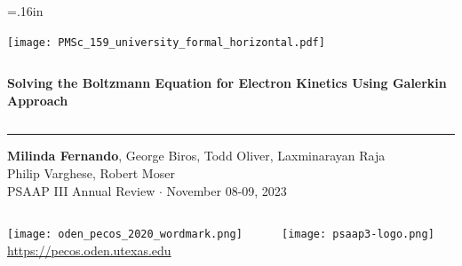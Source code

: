 \documentclass[mathserif, aspectratio=169]{beamer}
\begin{document}


\hoffset=.16in

\begin{frame}[plain,t]{}
\makeatletter
\texttt{[image: PMSc\_159\_university\_formal\_horizontal.pdf]} \newline
\begin{columns}[T,onlytextwidth]
{\bf \color{burntorange} \selectfont 
Solving the Boltzmann Equation for Electron Kinetics Using Galerkin Approach %
}
\end{columns}
\vspace*{.15cm}
\rule{.8\textwidth}{0.6pt} \newline

\vspace*{0.05cm}
{\selectfont
  { \scriptsize
    \textbf{Milinda Fernando}, George Biros, Todd Oliver, Laxminarayan Raja\\ Philip Varghese, Robert Moser \\%
  }
  {\color{burntorange} \tiny
    PSAAP III Annual Review $\cdot$ November 08-09, 2023
  }
}

\vspace*{1cm}
\begin{columns}
\begin{column}{0.8\linewidth}
\texttt{[image: oden\_pecos\_2020\_wordmark.png]}\\
{\scriptsize \url{https://pecos.oden.utexas.edu}}
\end{column}

\begin{column}{0.2\linewidth}
\texttt{[image: psaap3-logo.png]}
\end{column}
\end{columns}

\end{frame}
\hoffset=0in
\end{document}
